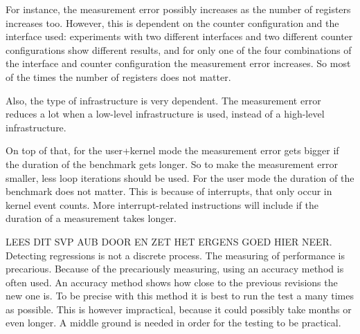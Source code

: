 For instance, the measurement error possibly increases as the number of registers increases too. However, this is dependent on the counter configuration and the interface used: experiments with two different interfaces and two different counter configurations show different results, and for only one of the four combinations of the interface and counter configuration the measurement error increases\cite{AccuracyPerformanceCounter}. So most of the times the number of registers does not matter.

Also, the type of infrastructure is very dependent. The measurement error reduces a lot when a low-level infrastructure is used, instead of a high-level infrastructure\cite{AccuracyPerformanceCounter}.

On top of that, for the user+kernel mode the measurement error gets bigger if the duration of the benchmark gets longer\cite{AccuracyPerformanceCounter}. So to make the measurement error smaller, less loop iterations should be used.  For the user mode the duration of the benchmark does not matter. This is because of interrupts, that only occur in kernel event counts. More interrupt-related instructions will include if the duration of a measurement takes longer.

LEES DIT SVP AUB DOOR EN ZET HET ERGENS GOED HIER NEER. \\
Detecting regressions is not a discrete process. The measuring of performance is precarious. Because of the precariously measuring, using an accuracy method is often used. An accuracy method shows how close to the previous revisions the new one is. To be precise with this method it is best to run the test a many times as possible. This is however impractical, because it could possibly take months or even longer. A middle ground is needed in order for the testing to be practical.\newline
\newline

